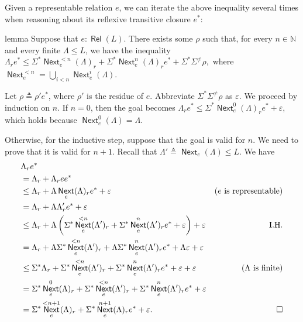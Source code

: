 \documentclass[a4paper,UKenglish,cleveref, autoref, thm-restate]{lipics-v2021}
\DeclareMathOperator{\Next}{\mathsf{Next}}
\DeclareMathOperator{\Rel}{\mathsf{Rel}}
\begin{document}
Given a representable relation $e$, we can iterate the above inequality several
times when reasoning about its reflexive transitive closure $e^*$:

\begin{theoremEnd}{lemma}
  \label{lem:representable-star}
  Suppose that $e : \Rel(L)$.  There exists some $ \rho $ such that, for every
  $n  \in  \mathbb{N}$ and every finite $ \Lambda   \leq  L$, we have the inequality
  \(  \Lambda _re^*  \leq   \Sigma ^*\Next_e^{<n}( \Lambda )_r +  \Sigma ^*\Next_e^n( \Lambda )_re^* +  \Sigma ^* \Sigma ^{ \neq } \rho , \) where
  $\Next_e^{<n} =  \bigcup _{i < n}\Next_e^i( \Lambda )$.
\end{theoremEnd}

\begin{proofEnd} %
  Let $ \rho   \triangleq   \rho 'e^*$, where $ \rho '$ is the residue of $e$. Abbreviate $ \Sigma ^* \Sigma ^{ \neq } \rho $ as
  $ \varepsilon $.  We proceed by induction on $n$.  If $n = 0$, then the goal becomes
  $ \Lambda _r e^*  \leq   \Sigma ^*\Next_e^0( \Lambda )_re^* +  \varepsilon $, which holds because $\Next_e^0( \Lambda ) =  \Lambda $.

  Otherwise, for the inductive step, suppose that the goal is valid for $n$.  We
  need to prove that it is valid for $n + 1$.  Recall that
  $ \Lambda '  \triangleq  \Next_e( \Lambda )  \leq  L$. We have
  \begin{align*}
    &  \Lambda _re^* \\
    & =  \Lambda _r +  \Lambda _ree^* \\
    &  \leq   \Lambda _r +  \Lambda \Next_e( \Lambda )_re^* +  \varepsilon 
    & \text{($e$ is representable)} \\
    & =  \Lambda _r +  \Lambda  \Lambda '_re^* +  \varepsilon  \\
    &  \leq   \Lambda _r %
      +  \Lambda \left( \Sigma ^*\Next_e^{<n}( \Lambda ')_r+ \Sigma ^*\Next_e^n( \Lambda ')_re^* +  \varepsilon \right) +  \varepsilon 
    & \text{I.H.} \\
    & =  \Lambda _r +  \Lambda  \Sigma ^*\Next_e^{<n}( \Lambda ')_r+ \Lambda  \Sigma ^*\Next_e^n( \Lambda ')_re^* +  \Lambda  \varepsilon  +  \varepsilon  \\
    &  \leq   \Sigma ^* \Lambda _r +  \Sigma ^*\Next_e^{<n}( \Lambda ')_r+ \Sigma ^*\Next_e^{n}( \Lambda ')_re^* +  \varepsilon  +  \varepsilon 
    & \text{($ \Lambda $ is finite)} \\
    & =  \Sigma ^*\Next_e^0( \Lambda )_r +  \Sigma ^*\Next_e^{<n}( \Lambda ')_r+ \Sigma ^*\Next_e^{n}( \Lambda ')_re^* +  \varepsilon  \\
    & =  \Sigma ^*\Next_e^{<n+1}( \Lambda )_r +  \Sigma ^*\Next_e^{n+1}( \Lambda )_re^* +  \varepsilon . & \qedhere
  \end{align*}
\end{proofEnd}
\end{document}
